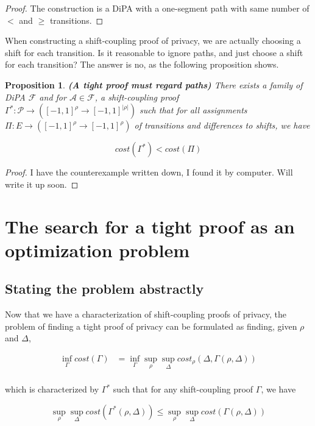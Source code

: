 \documentclass{article}
\newtheorem{proposition}{Proposition}[section]
\newcommand{\1}{\langle 1 \rangle}
\newcommand{\2}{\langle 2 \rangle}
\begin{document}
\begin{proof}
    The construction is a DiPA with a one-segment path with same number of $<$ and $\geq$ transitions.
\end{proof}

When constructing a shift-coupling proof of privacy, we are actually choosing a shift for each transition. Is it reasonable to ignore paths, and just choose a shift for each transition? The answer is no, as the following proposition shows.

\begin{proposition}
    \textbf{(A tight proof must regard paths)} There exists a family of DiPA $\mathcal{F}$ and for $\mathcal{A} \in \mathcal{F}$, a shift-coupling proof $\Gamma^*: \mathcal{P} \to ([-1, 1]^{\rho} \to [-1, 1]^{|\rho|})$ such that for all assignments $\Pi: E \to ([-1, 1]^{\rho} \to [-1, 1]^{\rho})$ of transitions and differences to shifts, we have

    \[cost(\Gamma^*) < cost(\Pi)\]
\end{proposition}

\begin{proof}
    I have the counterexample written down, I found it by computer. Will write it up soon.
\end{proof}

\section{The search for a tight proof as an optimization problem}

\subsection{Stating the problem abstractly}

Now that we have a characterization of shift-coupling proofs of privacy, the problem of finding a tight proof of privacy can be formulated as finding, given $\rho$ and $\Delta$,

\begin{align*}
    \inf_{\Gamma} cost(\Gamma) &= \inf_{\Gamma} \sup_{\rho} \sup_{\Delta} cost_{\rho}(\Delta, \Gamma(\rho, \Delta)) \\
\end{align*}

which is characterized by $\Gamma^*$ such that for any shift-coupling proof $\Gamma$, we have

\[\sup_{\rho} \sup_{\Delta} cost(\Gamma^*(\rho, \Delta)) \leq \sup_{\rho} \sup_{\Delta} cost(\Gamma(\rho, \Delta))\]
\end{document}
